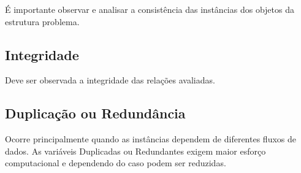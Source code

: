 É importante observar e analisar a consistência das instâncias dos objetos da estrutura problema.

\subsection{Integridade}

Deve ser observada a integridade das relações avaliadas.

\subsection{Duplicação ou Redundância}

Ocorre principalmente quando as instâncias dependem de diferentes fluxos de dados.
As variáveis Duplicadas ou Redundantes exigem maior esforço computacional e dependendo do caso podem ser reduzidas.
\cite{Livia}